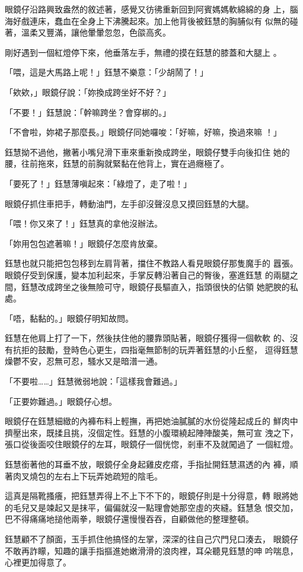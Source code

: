 眼鏡仔沿路興致盎然的敘述著，感覺又彷彿重新回到阿賓媽媽軟綿綿的身
上，腦海好戲連床，蠢血在全身上下沸騰起來。加上他背後被鈺慧的胸脯似有
似無的碰著，溫柔又豐滿，讓他暈暈忽忽，色燄高炙。

剛好遇到一個紅燈停下來，他垂落左手，無禮的摸在鈺慧的膝蓋和大腿上
。

「喂，這是大馬路上呢！」鈺慧不樂意：「少胡鬧了！」

「欸欸，」眼鏡仔說：「妳換成跨坐好不好？」

「不要！」鈺慧說：「幹嘛跨坐？會穿梆的。」

「不會啦，妳裙子那麼長。」眼鏡仔同她囉唆：「好嘛，好嘛，換過來嘛
！」

鈺慧拗不過他，撇著小嘴兒滑下車來重新換成跨坐，眼鏡仔雙手向後扣住
她的腰，往前拖來，鈺慧的前胸就緊黏在他背上，實在過癮極了。

「要死了！」鈺慧薄嗔起來：「綠燈了，走了啦！」

眼鏡仔抓住車把手，轉動油門，左手卻沒聲沒息又摸回鈺慧的大腿。

「喂！你又來了！」鈺慧真的拿他沒辦法。

「妳用包包遮著嘛！」眼鏡仔怎麼肯放棄。

鈺慧也就只能把包包移到左肩背著，擋住不教路人看見眼鏡仔那隻魔手的
囂張。眼鏡仔受到保護，變本加利起來，手掌反轉沿著自己的臀後，塞進鈺慧
的兩腿之間，鈺慧改成跨坐之後無險可守，眼鏡仔長驅直入，指頭很快的佔領
她肥腴的私處。

「唔，黏黏的。」眼鏡仔明知故問。

鈺慧在他肩上打了一下，然後扶住他的腰靠頭貼著，眼鏡仔獲得一個軟軟
的、沒有抗拒的鼓勵，登時色心更生，四指毫無節制的玩弄著鈺慧的小丘壑，
逗得鈺慧燥鬱不安，忍無可忍，騷水又是暗潽一通。

「不要啦……」鈺慧微弱地說：「這樣我會難過。」

「正要妳難過。」眼鏡仔心想。

眼鏡仔在鈺慧細緻的內褲布料上輕撫，再把她油膩膩的水份從隆起成丘的
鮮肉中擠壓出來，既揉且挑，沒個定性。鈺慧的小腹環繞起陣陣酸美，無可宣
洩之下，張口從後面咬住眼鏡仔的左耳，眼鏡仔一個恍惚，剎車不及就闖過了
一個紅燈。

鈺慧銜著他的耳垂不放，眼鏡仔全身起雞皮疙瘩，手指扯開鈺慧濕透的內
褲，順著肉叉燒包的左右上下玩弄她疏短的陰毛。

這真是隔靴搔癢，把鈺慧弄得上不上下不下的，眼鏡仔則是十分得意，轉
眼將她的毛兒又是竦起又是抹平，偏偏就沒一點理會她那空虛的夾縫。鈺慧急
恨交加，巴不得痛痛地搥他兩拳，眼鏡仔還慢慢吞吞，自顧做他的整理整頓。

鈺慧顧不了顏面，玉手抓住他搞怪的左掌，深深的往自己穴門兒口湊去，
眼鏡仔不敢再詐矇，知趣的讓手指摳進她嫩滑滑的浪肉裡，耳朵聽見鈺慧的呻
吟喘息，心裡更加得意了。

